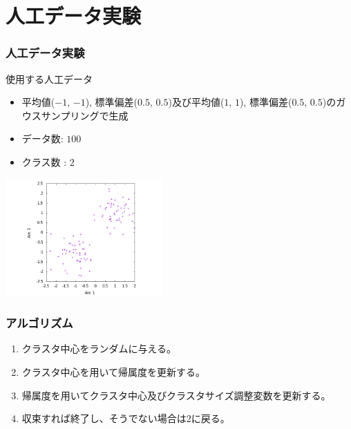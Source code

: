\documentclass[13pt,dvipdfmx]{beamer}
\begin{document}
\section{人工データ実験}
\begin{frame}\frametitle{人工データ実験}
  \begin{block}{使用する人工データ}
    \begin{itemize}
    \item 平均値($-1$, $-1$), 標準偏差($0.5$, $0.5$)及び平均値($1$, $1$), 標準偏差($0.5$, $0.5$)のガウスサンプリングで生成
    \item データ数: $100$
    \item クラス数 : $2$
    \end{itemize}
    \begin{center}
     \includegraphics[width=60mm]{2d-dat.png}
    \end{center}
  \end{block}
\end{frame}

\begin{frame}\frametitle{アルゴリズム}
  \begin{enumerate}
  \item クラスタ中心をランダムに与える。
  \item クラスタ中心を用いて帰属度を更新する。
  \item 帰属度を用いてクラスタ中心及びクラスタサイズ調整変数を更新する。
  \item 収束すれば終了し、そうでない場合は$2$に戻る。
  \end{enumerate}
\end{frame}
\end{document}
